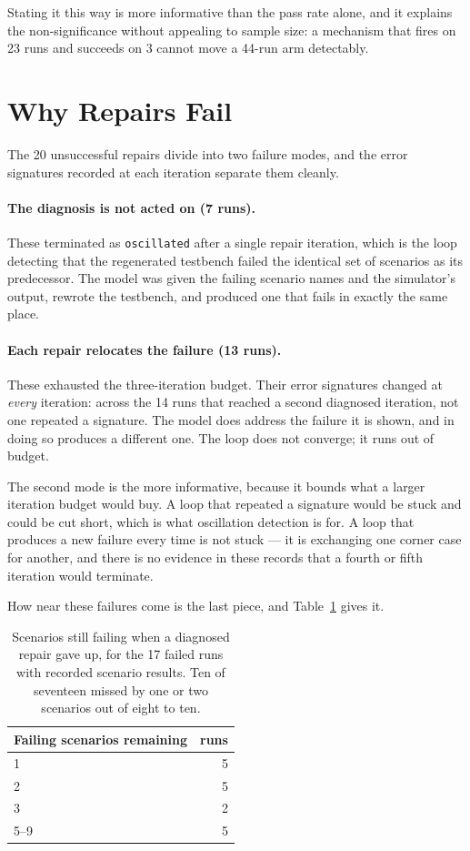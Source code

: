 \documentclass[11pt,a4paper,titlepage=false]{scrreprt}
\begin{document}
Stating it this way is more informative than the pass rate alone, and it explains the
non-significance without appealing to sample size: a mechanism that fires on 23 runs and
succeeds on 3 cannot move a 44-run arm detectably.

\section{Why Repairs Fail}\label{sec:res-repair-fail}

The 20 unsuccessful repairs divide into two failure modes, and the error signatures recorded
at each iteration separate them cleanly.

\paragraph{The diagnosis is not acted on (7 runs).} These terminated as
\texttt{oscillated} after a single repair iteration, which is the loop detecting that the
regenerated testbench failed the identical set of scenarios as its predecessor. The model was
given the failing scenario names and the simulator's output, rewrote the testbench, and
produced one that fails in exactly the same place.

\paragraph{Each repair relocates the failure (13 runs).} These exhausted the three-iteration
budget. Their error signatures changed at \emph{every} iteration: across the 14 runs that
reached a second diagnosed iteration, not one repeated a signature. The model does address
the failure it is shown, and in doing so produces a different one. The loop does not
converge; it runs out of budget.

The second mode is the more informative, because it bounds what a larger iteration budget
would buy. A loop that repeated a signature would be stuck and could be cut short, which is
what oscillation detection is for. A loop that produces a new failure every time is not
stuck --- it is exchanging one corner case for another, and there is no evidence in these
records that a fourth or fifth iteration would terminate.

How near these failures come is the last piece, and Table~\ref{tab:repair-nearmiss} gives it.

\begin{table}[H]
\centering
\small
\begin{tabular}{@{}l r@{}}
\toprule
\textbf{Failing scenarios remaining} & \textbf{runs} \\
\midrule
1 & 5 \\
2 & 5 \\
3 & 2 \\
5--9 & 5 \\
\bottomrule
\end{tabular}
\caption{Scenarios still failing when a diagnosed repair gave up, for the 17 failed runs with
recorded scenario results. Ten of seventeen missed by one or two scenarios out of eight to
ten.}
\label{tab:repair-nearmiss}
\end{table}
\end{document}
